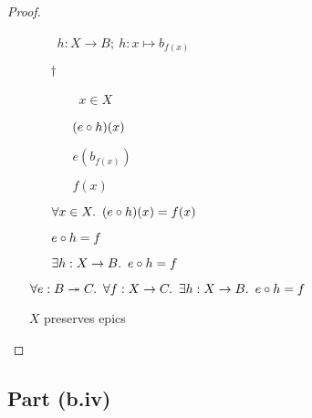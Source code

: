 \begin{prop}
\begin{proof}
\begin{itemize}
\begin{itemize}
            \addtolength{\itemsep}{+1\baselineskip}
            \item[\phs]
              \Let~$h : X \to B;~h : x \mapsto b_{f(x)}$
            \addtolength{\itemsep}{-1\baselineskip}

            \item[$\dagger$]
              \begin{itemize}
                \item[\phs]\Let~$x\in X$
                  \marginnote{\Hyp}

                \item[\phs] $(e\circ h)(x)$

                \item[\eqs] $e(b_{f(x)})$

                \item[\eqs] $f(x)$
              \end{itemize}

              \item[\imps]
                $\forall x\in X\ldotp~(e\circ h)(x) = f(x)$
                \marginnote{$\forall$-\Intro-$\dagger$}

              \item[\iffs]
                $e\circ h = f$
                \marginnote{\Def-$=$}

              \item[\imps]
                $\exists h : X \to B\ldotp~e\circ h = f$
                \marginnote{$\exists$-\Intro}
        \end{itemize}

        \item[\imps]
          $\forall e : B\twoheadrightarrow C\ldotp~\forall f : X \to C\ldotp~\exists h : X \to B\ldotp~e\circ h = f$
          \marginnote{$\forall$-\Intro-$\star$}

        \item[\iffs]
          $X$ preserves epics
          \qedhere
          \marginnote{\Thm-\ref{prop:epic-preserving}}
    \end{itemize}
  \end{proof}
\end{prop}

\subsection{Part (b.iv)}\label{sec:q-1-b-iv}

